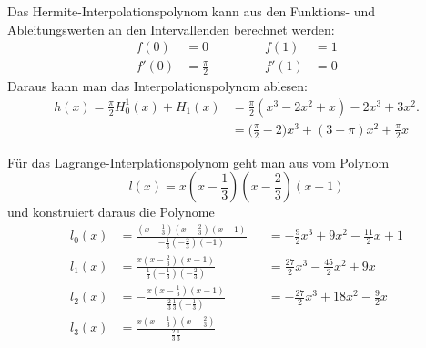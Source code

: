 \begin{loesung}
\begin{teilaufgaben}
\item
Das Hermite-Interpolationspolynom kann aus den Funktions- und
Ableitungswerten an den Intervallenden berechnet werden:
\begin{equation}
\begin{aligned}
 f(0) &=  0           &&\qquad &  f(1) &= 1 \\
f'(0) &= \frac{\pi}2  &&\qquad & f'(1) &= 0
\end{aligned}
\end{equation}
Daraus kann man das Interpolationspolynom ablesen:
\begin{align*}
h(x)
=
\frac{\pi}{2}H_0^1(x) + H_1(x)
&=
\frac{\pi}2 (x^3-2x^2+x) -2x^3+3x^2.
\\
&=
\biggl(\frac{\pi}2-2\biggr) x^3
+(3-\pi)x^2
+
\frac{\pi}2x
\end{align*}
\item
Für das Lagrange-Interplationspolynom geht man aus vom 
Polynom
\[
l(x) = x(x-{\textstyle\frac13})(x-{\textstyle\frac23})(x-1)
\]
und konstruiert daraus die Polynome
\begin{align*}
l_0(x) &= \frac{ (x-\frac13)(x-\frac23)(x-1)}{-\frac13(-\frac23)(-1)}
&&=-\frac92x^3+9x^2-\frac{11}2x+1
\\
l_1(x) &= \frac{x           (x-\frac23)(x-1)}{\frac13(-\frac13)(-\frac23)}
&&=\frac{27}2x^3-\frac{45}{2}x^2+9x
\\
l_2(x) &=-\frac{x(x-\frac13)           (x-1)}{\frac23\frac13(-\frac13)}
&&=-\frac{27}2x^3+18x^2-\frac92x
\\
l_3(x) &= \frac{x(x-\frac13)(x-\frac23)     }{\frac23\frac13}

\end{align*}
\end{teilaufgaben}
\end{loesung}

